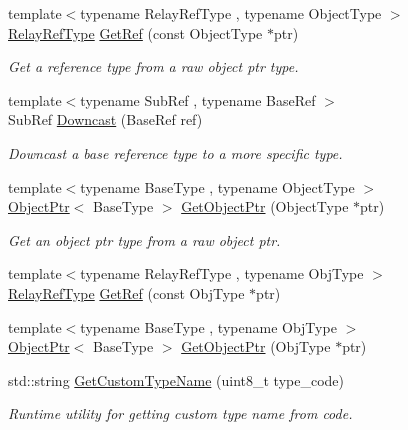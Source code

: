 \begin{DoxyCompactItemize}
{\footnotesize template$<$typename Relay\+Ref\+Type , typename Object\+Type $>$ }\\\hyperlink{classtvm_1_1RelayRefType}{Relay\+Ref\+Type} \hyperlink{namespacetvm_1_1runtime_aa4a97de4fefd23aa5942c6a545544a05}{Get\+Ref} (const Object\+Type $\ast$ptr)
\begin{DoxyCompactList}\small\item\em Get a reference type from a raw object ptr type. \end{DoxyCompactList}\item 
{\footnotesize template$<$typename Sub\+Ref , typename Base\+Ref $>$ }\\Sub\+Ref \hyperlink{namespacetvm_1_1runtime_a756a222aed384e208f32d35d3412c918}{Downcast} (Base\+Ref ref)
\begin{DoxyCompactList}\small\item\em Downcast a base reference type to a more specific type. \end{DoxyCompactList}\item 
{\footnotesize template$<$typename Base\+Type , typename Object\+Type $>$ }\\\hyperlink{classtvm_1_1runtime_1_1ObjectPtr}{Object\+Ptr}$<$ Base\+Type $>$ \hyperlink{namespacetvm_1_1runtime_a46bcf7948293194c5b9c7db91da96381}{Get\+Object\+Ptr} (Object\+Type $\ast$ptr)
\begin{DoxyCompactList}\small\item\em Get an object ptr type from a raw object ptr. \end{DoxyCompactList}\item 
{\footnotesize template$<$typename Relay\+Ref\+Type , typename Obj\+Type $>$ }\\\hyperlink{classtvm_1_1RelayRefType}{Relay\+Ref\+Type} \hyperlink{namespacetvm_1_1runtime_ad4c790ddcf38a1ef9800466cd0c1a0a2}{Get\+Ref} (const Obj\+Type $\ast$ptr)
\item 
{\footnotesize template$<$typename Base\+Type , typename Obj\+Type $>$ }\\\hyperlink{classtvm_1_1runtime_1_1ObjectPtr}{Object\+Ptr}$<$ Base\+Type $>$ \hyperlink{namespacetvm_1_1runtime_ac2d903012aff56c2bd54ff66f48450c3}{Get\+Object\+Ptr} (Obj\+Type $\ast$ptr)
\item 
std\+::string \hyperlink{namespacetvm_1_1runtime_a06a49d761ea6373557c24c01eaceb07d}{Get\+Custom\+Type\+Name} (uint8\+\_\+t type\+\_\+code)
\begin{DoxyCompactList}\small\item\em Runtime utility for getting custom type name from code. \end{DoxyCompactList}\item 

\end{DoxyCompactItemize}
